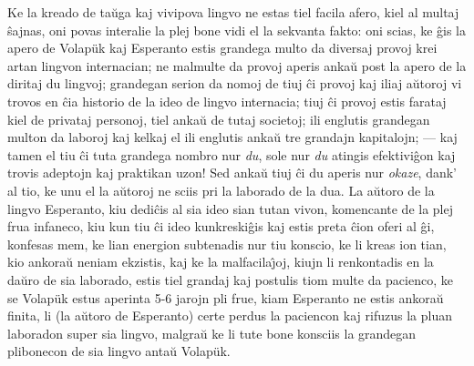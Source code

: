    Ke la kreado de ta\u uga kaj vivipova lingvo ne estas tiel facila
afero, kiel al multaj \^sajnas, oni povas interalie la plej bone
vidi el la sekvanta fakto: oni scias, ke \^gis la apero de Volap\"uk
kaj Esperanto estis grandega multo da diversaj provoj krei artan
lingvon internacian; ne malmulte da provoj aperis anka\u u post la
apero de la diritaj du lingvoj; grandegan serion da nomoj de tiuj
\^ci provoj kaj iliaj a\u utoroj vi trovos en \^cia historio de la
ideo de lingvo internacia; tiuj \^ci provoj estis farataj kiel de
privataj personoj, tiel anka\u u de tutaj societoj; ili englutis
grandegan multon da laboroj kaj kelkaj el ili englutis anka\u u tre
grandajn kapitalojn; --- kaj tamen el tiu \^ci tuta grandega nombro
nur {\sl du}, sole nur {\sl du} atingis efektivi\^gon kaj trovis
adeptojn kaj praktikan uzon! Sed anka\u u tiuj \^ci du aperis nur
{\sl okaze}, dank' al tio, ke unu el la a\u utoroj ne sciis pri la
laborado de la dua. La a\u utoro de la lingvo Esperanto, kiu
dedi\^cis al sia ideo sian tutan vivon, komencante de la plej frua
infaneco, kiu kun tiu \^ci ideo kunkreski\^gis kaj estis preta
\^cion oferi al \^gi, konfesas mem, ke lian energion subtenadis nur
tiu konscio, ke li kreas ion tian, kio ankora\u u neniam ekzistis,
kaj ke la malfacila\^{\j}oj, kiujn li renkontadis en la da\u uro de
sia laborado, estis tiel grandaj kaj postulis tiom multe da
pacienco, ke se Volap\"uk estus aperinta 5-6 jarojn pli frue, kiam
Esperanto ne estis ankora\u u finita, li (la a\u utoro de Esperanto)
certe perdus la paciencon kaj rifuzus la pluan laboradon super sia
lingvo, malgra\u u ke li tute bone konsciis la grandegan plibonecon
de sia lingvo anta\u u Volap\"uk.

